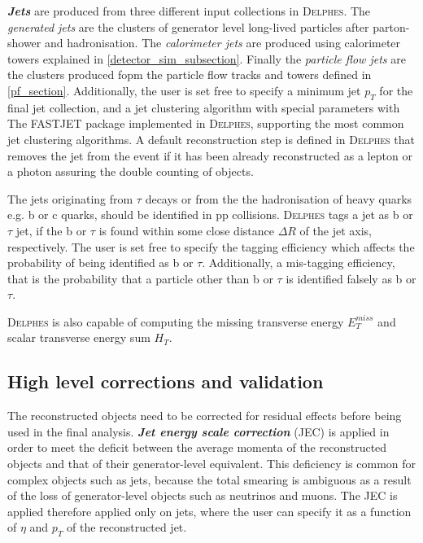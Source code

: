 {\emph{\bf{Jets}} are produced from three different input collections in \textsc{Delphes}. The \emph{generated jets} are the clusters of generator level long-lived particles after parton- shower and hadronisation. The \emph{calorimeter jets} are produced using calorimeter towers explained in \autoref{detector_sim_subsection}. Finally the \emph{particle flow jets} are the clusters produced fopm the particle flow tracks and towers defined in \autoref{pf_section}. Additionally, the user is set free to specify a minimum jet $p_T$ for the final jet collection, and a jet clustering algorithm with special parameters with The FASTJET package \cite{Cacciari2012} implemented in \textsc{Delphes}, supporting the most common jet clustering algorithms. A default reconstruction step is defined in \textsc{Delphes} that removes the jet from the event if it has been already reconstructed as a lepton or a photon assuring the double counting of objects.

The jets originating from $\tau$ decays or from the the hadronisation of heavy quarks e.g. b or c quarks, should be identified in pp collisions. \textsc{Delphes} tags a jet as b or $\tau$ jet, if the b or $\tau$ is found within some close distance $\Delta R$ of the jet axis, respectively. The user is set free to specify the tagging efficiency which affects the probability of being identified as b or $\tau$. Additionally, a mis-tagging efficiency, that is the probability that a particle other than b or $\tau$ is identified falsely as b or $\tau$.

\textsc{Delphes} is also capable of computing the missing transverse energy $E_T^{miss}$ and scalar transverse energy sum $H_T$.

\subsection{High level corrections and validation}

The reconstructed objects need to be corrected for residual effects before being used in the final analysis. \emph{\bf{Jet energy scale correction}} (JEC) is applied in order to meet the deficit between the average momenta of the reconstructed objects and that of their generator-level equivalent. This deficiency is common for complex objects such as jets, because the total smearing is ambiguous as a result of the loss of generator-level objects such as neutrinos and muons. The JEC is applied therefore applied only on jets, where the user can specify it as a function of $\eta$ and $p_T$ of the reconstructed jet.

}
